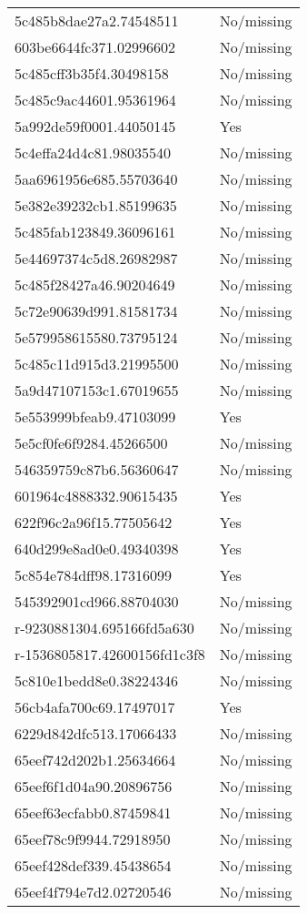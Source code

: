 \begin{tabular}{ll}
5c485b8dae27a2.74548511 & No/missing \\
603be6644fc371.02996602 & No/missing \\
5c485cff3b35f4.30498158 & No/missing \\
5c485c9ac44601.95361964 & No/missing \\
5a992de59f0001.44050145 & Yes \\
5c4effa24d4c81.98035540 & No/missing \\
5aa6961956e685.55703640 & No/missing \\
5e382e39232cb1.85199635 & No/missing \\
5c485fab123849.36096161 & No/missing \\
5e44697374c5d8.26982987 & No/missing \\
5c485f28427a46.90204649 & No/missing \\
5c72e90639d991.81581734 & No/missing \\
5e579958615580.73795124 & No/missing \\
5c485c11d915d3.21995500 & No/missing \\
5a9d47107153c1.67019655 & No/missing \\
5e553999bfeab9.47103099 & Yes \\
5e5cf0fe6f9284.45266500 & No/missing \\
546359759c87b6.56360647 & No/missing \\
601964c4888332.90615435 & Yes \\
622f96c2a96f15.77505642 & Yes \\
640d299e8ad0e0.49340398 & Yes \\
5c854e784dff98.17316099 & Yes \\
545392901cd966.88704030 & No/missing \\
r-9230881304.695166fd5a630 & No/missing \\
r-1536805817.42600156fd1c3f8 & No/missing \\
5c810e1bedd8e0.38224346 & No/missing \\
56cb4afa700c69.17497017 & Yes \\
6229d842dfc513.17066433 & No/missing \\
65eef742d202b1.25634664 & No/missing \\
65eef6f1d04a90.20896756 & No/missing \\
65eef63ecfabb0.87459841 & No/missing \\
65eef78c9f9944.72918950 & No/missing \\
65eef428def339.45438654 & No/missing \\
65eef4f794e7d2.02720546 & No/missing \\

\end{tabular}
